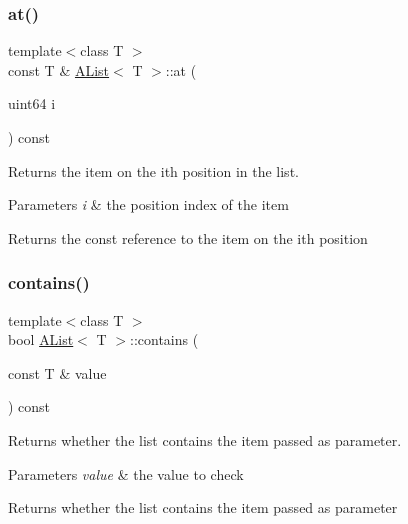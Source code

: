\subsubsection{\texorpdfstring{at()}{at()}\hspace{0.1cm}{\footnotesize\ttfamily [2/2]}}
{\footnotesize\ttfamily template$<$class T $>$ \\
const T \& \mbox{\hyperlink{class_a_list}{A\+List}}$<$ T $>$\+::at (\begin{DoxyParamCaption}\item[{uint64}]{i }\end{DoxyParamCaption}) const}



Returns the item on the ith position in the list. 


\begin{DoxyParams}{Parameters}
{\em i} & the position index of the item \\
\hline
\end{DoxyParams}
\begin{DoxyReturn}{Returns}
the const reference to the item on the ith position 
\end{DoxyReturn}
\mbox{\label{class_a_list_ab3db4e8f60d5abf4e7a12d928fb244a0}} 
\subsubsection{\texorpdfstring{contains()}{contains()}}
{\footnotesize\ttfamily template$<$class T $>$ \\
bool \mbox{\hyperlink{class_a_list}{A\+List}}$<$ T $>$\+::contains (\begin{DoxyParamCaption}\item[{const T \&}]{value }\end{DoxyParamCaption}) const\hspace{0.3cm}{\ttfamily [inline]}}



Returns whether the list contains the item passed as parameter. 


\begin{DoxyParams}{Parameters}
{\em value} & the value to check \\
\hline
\end{DoxyParams}
\begin{DoxyReturn}{Returns}
whether the list contains the item passed as parameter 
\end{DoxyReturn}
\mbox{\label{class_a_list_a080adc45c0ae48857fbc0a6ef5d18b7d}} 
